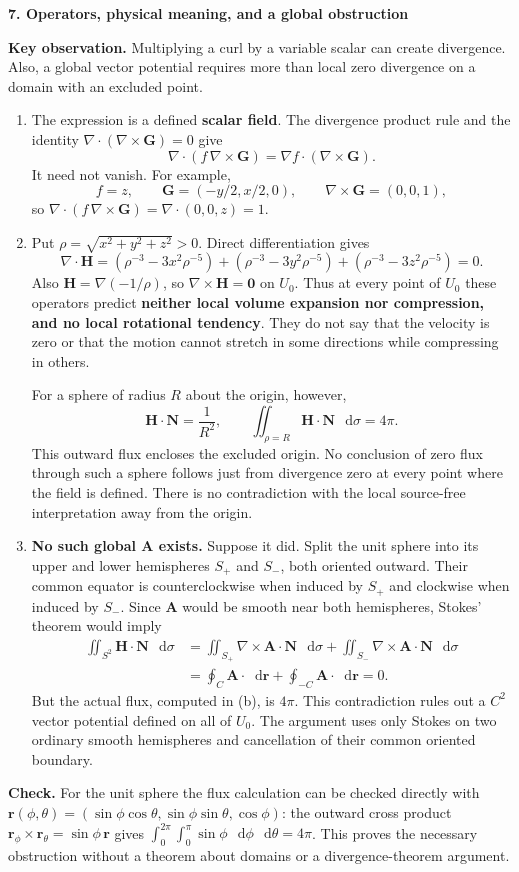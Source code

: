 \documentclass[11pt,letterpaper]{article}
\newcommand{\curl}{\nabla\times}
\newcommand{\dv}{\nabla\cdot}
\renewcommand{\vec}[1]{\mathbf{#1}}
\newcommand{\dd}{\mathop{}\!\mathrm{d}}
\newcommand{\grad}{\nabla}
\newcommand{\solutionproblem}[3]{%
  \par\bigskip\Needspace{7\baselineskip}
  \noindent\textbf{#1. #2}\par\nobreak
}
\newcommand{\insight}[1]{\par\textbf{Key observation.} #1\par}
\newcommand{\verification}[1]{\par\textbf{Check.} #1\par}
\begin{document}
\solutionproblem{7}{Operators, physical meaning, and a global obstruction}{14}
\insight{Multiplying a curl by a variable scalar can create divergence.
Also, a global vector potential requires more than local zero divergence
on a domain with an excluded point.}
\begin{enumerate}[label=(\alph*)]
\item The expression is a defined \textbf{scalar field}. The divergence
product rule and the identity $\dv(\curl\vec G)=0$ give
\[
\boxed{\dv(f\,\curl\vec G)=\grad f\cdot(\curl\vec G).}
\]
It need not vanish. For example,
\[
f=z,\qquad \vec G=(-y/2,x/2,0),\qquad
\curl\vec G=(0,0,1),
\]
so $\dv(f\,\curl\vec G)=\dv(0,0,z)=1$.

\item Put $\rho=\sqrt{x^2+y^2+z^2}>0$. Direct differentiation gives
\[
\dv\vec H
=\left(\rho^{-3}-3x^2\rho^{-5}\right)
+\left(\rho^{-3}-3y^2\rho^{-5}\right)
+\left(\rho^{-3}-3z^2\rho^{-5}\right)=0.
\]
Also $\vec H=\grad(-1/\rho)$, so $\curl\vec H=\vec0$ on $U_0$.
Thus at every point of $U_0$ these operators predict \textbf{neither
local volume expansion nor compression, and no local rotational tendency}.
They do not say that the velocity is zero or that the motion cannot stretch
in some directions while compressing in others.

For a sphere of radius $R$ about the origin, however,
\[
\vec H\cdot\vec N=\frac1{R^2},\qquad
\iint_{\rho=R}\vec H\cdot\vec N\,\dd\sigma=4\pi.
\]
This outward flux encloses the excluded origin. No conclusion of zero
flux through such a sphere follows just from divergence zero at every
point where the field is defined. There is no contradiction with the
local source-free interpretation away from the origin.

\item \textbf{No such global $\vec A$ exists.} Suppose it did. Split the
unit sphere into its upper and lower hemispheres $S_+$ and $S_-$, both
oriented outward. Their common equator is counterclockwise when induced
by $S_+$ and clockwise when induced by $S_-$. Since $\vec A$ would be
smooth near both hemispheres, Stokes' theorem would imply
\[
\begin{aligned}
\iint_{S^2}\vec H\cdot\vec N\,\dd\sigma
&=\iint_{S_+}\curl\vec A\cdot\vec N\,\dd\sigma
+\iint_{S_-}\curl\vec A\cdot\vec N\,\dd\sigma\\
&=\oint_{C}\vec A\cdot\dd\vec r
+\oint_{-C}\vec A\cdot\dd\vec r=0.
\end{aligned}
\]
But the actual flux, computed in (b), is $4\pi$. This contradiction
rules out a $C^2$ vector potential defined on all of $U_0$. The argument
uses only Stokes on two ordinary smooth hemispheres and cancellation of
their common oriented boundary.
\end{enumerate}
\verification{For the unit sphere the flux calculation can be checked
directly with
$\vec r(\phi,\theta)=(\sin\phi\cos\theta,\sin\phi\sin\theta,\cos\phi)$:
the outward cross product $\vec r_\phi\times\vec r_\theta
=\sin\phi\,\vec r$ gives
$\int_0^{2\pi}\int_0^\pi\sin\phi\,\dd\phi\,\dd\theta=4\pi$.
This proves the necessary obstruction without a theorem about domains
or a divergence-theorem argument.}
\end{document}
